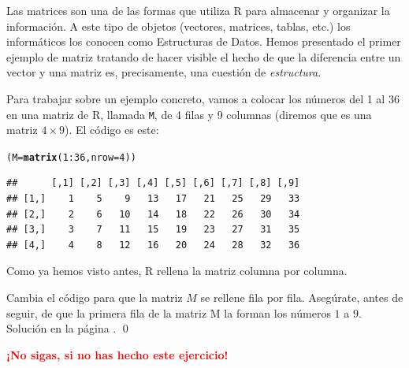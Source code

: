 \documentclass[10pt,a4paper]{article}\usepackage[]{graphicx}\usepackage[]{color}
\makeatletter
\newcommand{\hlnum}[1]{\textcolor[rgb]{0.686,0.059,0.569}{#1}}%
\newcommand{\hlopt}[1]{\textcolor[rgb]{0,0,0}{#1}}%
\newcommand{\hlstd}[1]{\textcolor[rgb]{0.345,0.345,0.345}{#1}}%
\newcommand{\hlkwb}[1]{\textcolor[rgb]{0.69,0.353,0.396}{#1}}%
\newcommand{\hlkwc}[1]{\textcolor[rgb]{0.333,0.667,0.333}{#1}}%
\newcommand{\hlkwd}[1]{\textcolor[rgb]{0.737,0.353,0.396}{\textbf{#1}}}%
\newenvironment{kframe}{%
 \def\at@end@of@kframe{}%
 \ifinner\ifhmode%
  \def\at@end@of@kframe{\end{minipage}}%
  \begin{minipage}{\columnwidth}%
 \fi\fi%
 \def\FrameCommand##1{\hskip\@totalleftmargin \hskip-\fboxsep
 \colorbox{shadecolor}{##1}\hskip-\fboxsep
     \hskip-\linewidth \hskip-\@totalleftmargin \hskip\columnwidth}%
 \MakeFramed {\advance\hsize-\width
   \@totalleftmargin\z@ \linewidth\hsize
   \@setminipage}}%
 {\par\unskip\endMakeFramed%
 \at@end@of@kframe}
\newenvironment{knitrout}{}{} %
\makeatother
\begin{document}
Las matrices son una de las formas que utiliza R para almacenar y organizar la información. A este tipo de objetos (vectores, matrices, tablas, etc.) los informáticos los conocen como Estructuras de Datos. Hemos presentado el primer ejemplo de matriz tratando de hacer visible el hecho de que la diferencia entre un vector y una matriz es, precisamente, una cuestión de {\em estructura}.

Para trabajar sobre un ejemplo concreto, vamos a colocar los números del 1 al 36 en una matriz de R, llamada {\tt M}, de 4 filas y 9 columnas (diremos que es una matriz $4\times 9$). El código es este:
\begin{knitrout}
\color{fgcolor}\begin{kframe}
\begin{alltt}
\hlstd{(M} \hlkwb{=} \hlkwd{matrix}\hlstd{(}\hlnum{1}\hlopt{:}\hlnum{36}\hlstd{,} \hlkwc{nrow}\hlstd{=}\hlnum{4}\hlstd{) )}
\end{alltt}
\begin{verbatim}
##      [,1] [,2] [,3] [,4] [,5] [,6] [,7] [,8] [,9]
## [1,]    1    5    9   13   17   21   25   29   33
## [2,]    2    6   10   14   18   22   26   30   34
## [3,]    3    7   11   15   19   23   27   31   35
## [4,]    4    8   12   16   20   24   28   32   36
\end{verbatim}
\end{kframe}
\end{knitrout}
Como ya hemos visto antes, R rellena la matriz columna por columna.

\begin{ejercicio}
\label{tut03:ejercicio03}
\quad
Cambia el código para que la matriz $M$ se rellene fila por fila. Asegúrate, antes de seguir, de que la primera fila de la matriz M la forman los números $1$ a $9$. Solución en la página \pageref{tut03:ejercicio03:sol}.
\qed
\end{ejercicio}

\begin{center}
\textcolor{red}{\Large\bf  ¡No sigas, si no has hecho este ejercicio!}
\end{center}
\newpage
\end{document}
